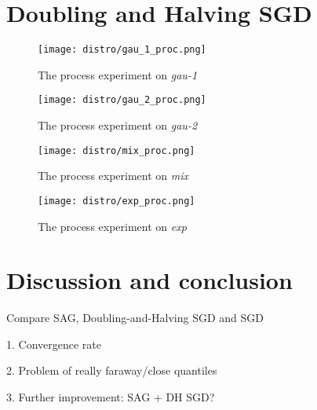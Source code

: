 \section{Doubling and Halving SGD}

\graphicspath{{Figures/Stepsize_adapt/Adaptive_stepsize/}{./}} 

\begin{figure}[H]
    \centering
	\texttt{[image: distro/gau\_1\_proc.png]}
	\caption{The process experiment on \textit{gau-1}}
\end{figure}

\begin{figure}[H]
    \centering
	\texttt{[image: distro/gau\_2\_proc.png]}
	\caption{The process experiment on \textit{gau-2}}
\end{figure}

\begin{figure}[H]
    \centering
	\texttt{[image: distro/mix\_proc.png]}
	\caption{The process experiment on \textit{mix}}
\end{figure}

\begin{figure}[H]
    \centering
	\texttt{[image: distro/exp\_proc.png]}
	\caption{The process experiment on \textit{exp}}
\end{figure}

\section{Discussion and conclusion}

Compare SAG, Doubling-and-Halving SGD and SGD

1. Convergence rate

2. Problem of really faraway/close quantiles

3. Further improvement: SAG + DH SGD?
